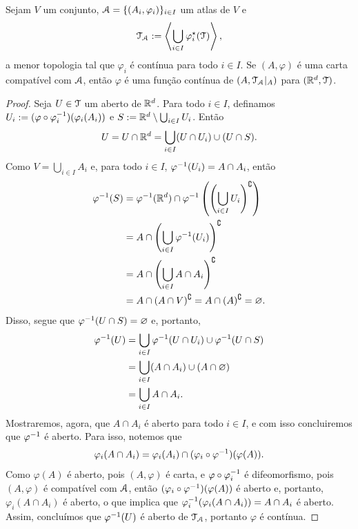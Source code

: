 \begin{prop}
Sejam $V$ um conjunto, $\mathcal{A}=\{(A_i,\varphi_i)\}_{i \in I}$ um atlas de $V$ e
	\begin{equation*}
	\mathcal{T}_{\mathcal{A}} := \left\langle \bigcup_{i \in I} \varphi_i^\star(\mathcal{T}) \right\rangle,
	\end{equation*}
a menor topologia tal que $\varphi_i$ é contínua para todo $i \in I$. Se $(A,\varphi)$ é uma carta compatível com $\mathcal{A}$, então $\varphi$ é uma função contínua de $(A,\mathcal{T}_{\mathcal{A}}|_A)$ para $(\mathbb{R}^d,\mathcal{T})$.
\end{prop}
\begin{proof}
Seja $U \in \mathcal{T}$ um aberto de $\mathbb{R}^d$. Para todo $i \in I$, definamos $U_i := (\varphi \circ \varphi_i^{-1})(\varphi_i(A_i))$ e $S := \mathbb{R}^d \setminus \bigcup_{i \in I} U_i$. Então
	\begin{equation*}
	U = U \cap \mathbb{R}^d = \bigcup_{i \in I} (U \cap U_i) \cup (U \cap S).
	\end{equation*}
Como $V=\bigcup_{i \in I} A_i$ e, para todo $i \in I$, $\varphi^{-1}(U_i) = A \cap A_i$, então
	\begin{align*}
	\varphi^{-1}(S) &= \varphi^{-1}(\mathbb{R}^d) \cap \varphi^{-1}\left(\left(\bigcup_{i \in I} U_i\right)^\complement\right) \\
		&= A \cap \left(\bigcup_{i \in I} \varphi^{-1}(U_i) \right)^\complement \\
		&= A \cap \left(\bigcup_{i \in I} A \cap A_i \right)^\complement \\
		&= A \cap (A \cap V)^\complement = A \cap (A)^\complement = \varnothing.
	\end{align*}
Disso, segue que $\varphi^{-1}(U \cap S)=\varnothing$ e, portanto,
	\begin{align*}
	\varphi^{-1}(U) &= \bigcup_{i \in I} \varphi^{-1}(U \cap U_i) \cup \varphi^{-1}(U \cap S) \\
		&= \bigcup_{i \in I} (A \cap A_i) \cup (A \cap\varnothing) \\
		&= \bigcup_{i \in I} A \cap A_i.
	\end{align*}
Mostraremos, agora, que $A \cap A_i$ é aberto para todo $i \in I$, e com isso concluiremos que $\varphi^{-1}$ é aberto. Para isso, notemos que
	\begin{equation*}
	\varphi_i(A \cap A_i) = \varphi_i(A_i) \cap (\varphi_i \circ \varphi^{-1})(\varphi(A)).
	\end{equation*}
Como $\varphi(A)$ é aberto, pois $(A,\varphi)$ é carta, e $\varphi \circ \varphi_i^{-1}$ é difeomorfismo, pois $(A,\varphi)$ é compatível com $\mathcal{A}$, então $(\varphi_i \circ \varphi^{-1})(\varphi(A))$ é aberto e, portanto, $\varphi_i(A \cap A_i)$ é aberto, o que implica que $\varphi_i^{-1}(\varphi_i(A \cap A_i)) = A \cap A_i$ é aberto. Assim, concluímos que $\varphi^{-1}(U)$ é aberto de $\mathcal{T}_{\mathcal{A}}$, portanto $\varphi$ é contínua.
\end{proof}

